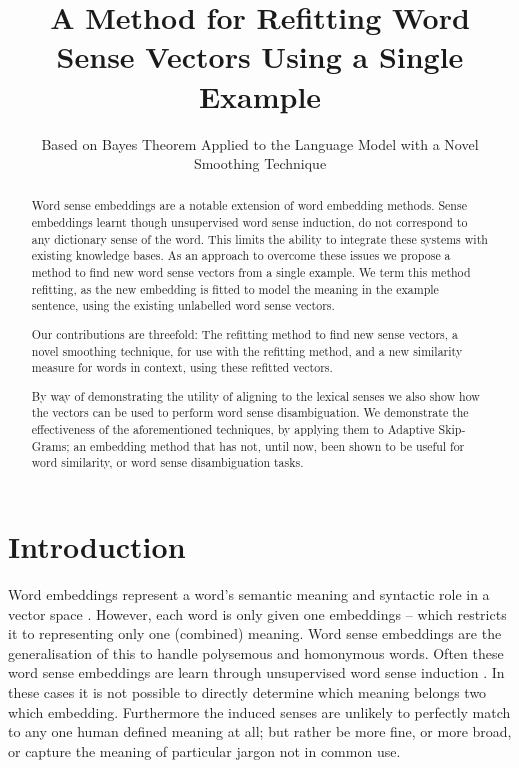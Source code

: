 \documentclass{sig-alternate}
\begin{document}
\title{A Method for Refitting Word Sense Vectors Using a Single Example}
\subtitle{Based on Bayes Theorem Applied to the Language Model with a Novel Smoothing Technique}
\maketitle

\begin{abstract}
Word sense embeddings are a  notable extension of word embedding methods.
Sense embeddings learnt though unsupervised word sense induction, do not correspond to any dictionary sense of the word.
This limits the ability to integrate these systems with existing knowledge bases.
As an approach to overcome these issues we propose a method to find new word sense vectors from a single example.
We term this method refitting, as the new embedding is fitted to model the meaning in the example sentence, using the existing unlabelled word sense vectors.

Our contributions are threefold:
The refitting method to find new sense vectors,
a novel smoothing technique, for use with the refitting method,
and a new similarity measure for words in context, using these refitted vectors.

By way of demonstrating the utility of aligning to the lexical senses we also show how the vectors can be used to perform word sense disambiguation.
We demonstrate the effectiveness of the aforementioned techniques, by applying them to Adaptive Skip-Grams;
an embedding method that has not, until now, been shown to be useful for word similarity, or  word sense disambiguation tasks. 
\end{abstract}

\section{Introduction}


Word embeddings represent a word's semantic meaning and syntactic role in a vector space \parencite{NPLM, collobert2008unified, mikolov2013efficient}. However, each word is only given one embeddings -- which restricts it to representing only one (combined) meaning. Word sense embeddings are the generalisation of this to handle polysemous and homonymous  words. Often these word sense embeddings are learn through unsupervised word sense induction \parencite{Reisinger2010,Huang2012,tian2014probabilistic, AdaGrams}. In these cases it is not possible to directly determine which meaning belongs two which embedding. Furthermore the induced senses are unlikely to perfectly match to any one human defined meaning at all; but rather be more fine, or more broad, or capture the meaning of particular jargon not in common use.
\end{document}
